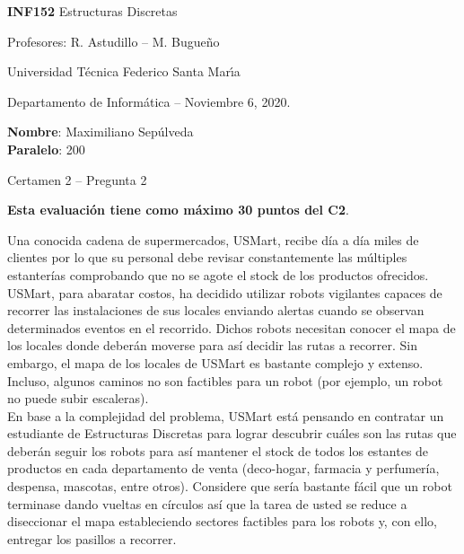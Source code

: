 \documentclass[letterpaper,10pt]{article}
\begin{document}
\thispagestyle{empty}

\begin{minipage}[t]{0.6\textwidth}

{\LARGE \textbf{INF152} Estructuras Discretas}

{\large Profesores: R. Astudillo -- M. Bugueño}

Universidad Técnica Federico Santa Mar\'{\i}a

Departamento de Informática -- Noviembre 6, 2020.

\end{minipage}
\hfill
\begin{minipage}[t]{0.35\textwidth}
\textbf{Nombre}: Maximiliano Sepúlveda\\[0.3cm]
  \textbf{Paralelo}: 200
\end{minipage}

\vspace{0.8cm}

{\Large Certamen 2 -- Pregunta 2}

\vspace{0.4cm}

\textbf{Esta evaluación tiene como máximo 30 puntos del C2}.

Una conocida cadena de supermercados, USMart, recibe día a día miles de clientes por lo que su personal debe revisar constantemente las múltiples estanterías comprobando que no se agote el stock de los productos ofrecidos. USMart, para abaratar costos, ha decidido utilizar robots vigilantes capaces de recorrer las instalaciones de sus locales enviando alertas cuando se observan determinados eventos en el recorrido. Dichos robots necesitan conocer el mapa de los locales donde deberán moverse para así decidir las rutas a recorrer. Sin embargo, el mapa de los locales de USMart es bastante complejo y extenso. Incluso, algunos caminos no son factibles para un robot (por ejemplo, un robot no puede subir escaleras). \\
En base a la complejidad del problema, USMart está pensando en contratar un estudiante de Estructuras Discretas para lograr descubrir cuáles son las rutas que deberán seguir los robots para así mantener el stock de todos los estantes de productos en cada departamento de venta (deco-hogar, farmacia y perfumería, despensa, mascotas, entre otros). Considere que sería bastante fácil que un robot terminase dando vueltas en círculos así que la tarea de usted se reduce a diseccionar el mapa estableciendo sectores factibles para los robots y, con ello, entregar los pasillos a recorrer.
\end{document}
